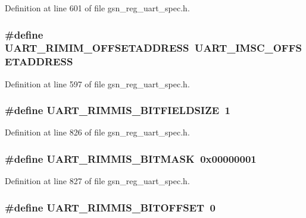 Definition at line 601 of file gsn\_\-reg\_\-uart\_\-spec.h.

\hypertarget{a00575_a25a05e0e62da784eba4f3766671d4093}{
\subsubsection[{UART\_\-RIMIM\_\-OFFSETADDRESS}]{\setlength{\rightskip}{0pt plus 5cm}\#define UART\_\-RIMIM\_\-OFFSETADDRESS~UART\_\-IMSC\_\-OFFSETADDRESS}}
\label{a00575_a25a05e0e62da784eba4f3766671d4093}


Definition at line 597 of file gsn\_\-reg\_\-uart\_\-spec.h.

\hypertarget{a00575_ae4efbc5267c570ba50648d2866696995}{
\subsubsection[{UART\_\-RIMMIS\_\-BITFIELDSIZE}]{\setlength{\rightskip}{0pt plus 5cm}\#define UART\_\-RIMMIS\_\-BITFIELDSIZE~1}}
\label{a00575_ae4efbc5267c570ba50648d2866696995}


Definition at line 826 of file gsn\_\-reg\_\-uart\_\-spec.h.

\hypertarget{a00575_ad3351f74ee2cf12603dfe8fce69a91ce}{
\subsubsection[{UART\_\-RIMMIS\_\-BITMASK}]{\setlength{\rightskip}{0pt plus 5cm}\#define UART\_\-RIMMIS\_\-BITMASK~0x00000001}}
\label{a00575_ad3351f74ee2cf12603dfe8fce69a91ce}


Definition at line 827 of file gsn\_\-reg\_\-uart\_\-spec.h.

\hypertarget{a00575_a0334dcf62fdeece18d168845b5af675f}{
\subsubsection[{UART\_\-RIMMIS\_\-BITOFFSET}]{\setlength{\rightskip}{0pt plus 5cm}\#define UART\_\-RIMMIS\_\-BITOFFSET~0}}
\label{a00575_a0334dcf62fdeece18d168845b5af675f}


